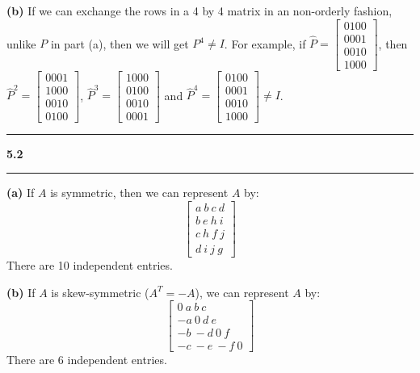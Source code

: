 \documentclass[11pt]{article}
\newcommand\question[2]{\vspace{.25in}\hrule\textbf{#1 #2}\vspace{.5em}\hrule\vspace{.10in}}
\renewcommand\part[1]{\vspace{.10in}\textbf{(#1)}}
\begin{document}
\part{b} If we can exchange the rows in a 4 by 4 matrix in an non-orderly fashion, unlike \(P\) in part (a), then we will get \(P^4 \neq I\). For example, if \(\hat{P} = \begin{bmatrix} 0 1 0 0 \\ 0 0 0 1 \\ 0 0 1 0 \\ 1 0 0 0 \end{bmatrix}\), then \(\hat{P}^2 = \begin{bmatrix} 0 0 0 1 \\ 1 0 0 0 \\ 0 0 1 0 \\ 0 1 0 0 \end{bmatrix}\), \(\hat{P}^3 = \begin{bmatrix} 1 0 0 0 \\ 0 1 0 0 \\ 0 0 1 0 \\ 0 0 0 1 \end{bmatrix}\) and \(\hat{P}^4 = \begin{bmatrix} 0 1 0 0 \\ 0 0 0 1 \\ 0 0 1 0 \\ 1 0 0 0 \end{bmatrix} \neq I\).

\question{5.2}{}
\part{a} If \(A\) is symmetric, then we can represent \(A\) by:
$$\begin{bmatrix} a \ b \ c \ d \\ b \ e \ h \ i \\ c \ h \ f \ j \\ d \ i \ j \ g \end{bmatrix}$$
There are 10 independent entries.

\part{b} If \(A\) is skew-symmetric (\(A^{T} = - A\)), we can represent \(A\) by:
$$\begin{bmatrix} 0 \ a \ b \ c \\ -a \ 0 \ d \ e \\ -b \ -d \ 0 \ f \\ -c \ -e \ -f \ 0 \end{bmatrix}$$
There are 6 independent entries.
\end{document}
